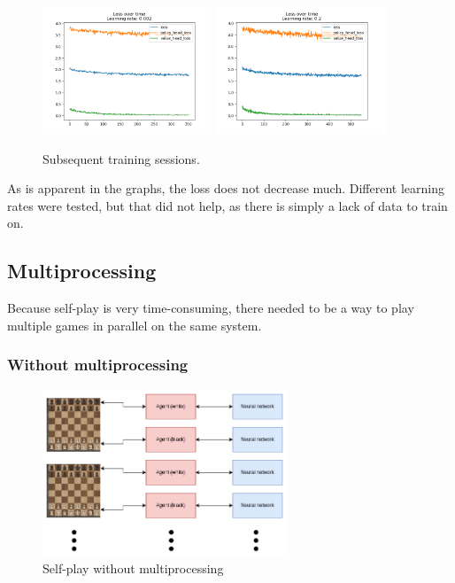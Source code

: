 \documentclass{article}
\begin{document}
\begin{figure}[H]
    \centering
    \includegraphics[width=0.45\textwidth]{img/plots/loss-2022-04-14_20:31:55.png}
    \includegraphics[width=0.45\textwidth]{img/plots/loss-2022-04-17_20:06:09.png}
    \caption{Subsequent training sessions.}
\end{figure}

As is apparent in the graphs, the loss does not decrease much. 
Different learning rates were tested, but that did not help, as there is simply a lack of data to train on.


\subsection{Multiprocessing}

Because self-play is very time-consuming, there needed to be a way to play multiple games in parallel 
on the same system.

\subsubsection{Without multiprocessing}

\begin{figure}[H]
    \centering
    \includegraphics[width=0.65\textwidth]{img/without-multiprocessing.png}
    \caption{Self-play without multiprocessing}
\end{figure}
\end{document}
